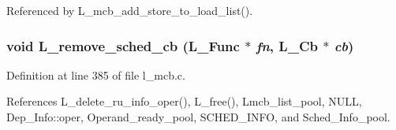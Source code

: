Referenced by L\_\-mcb\_\-add\_\-store\_\-to\_\-load\_\-list().
\subsubsection{\setlength{\rightskip}{0pt plus 5cm}void L\_\-remove\_\-sched\_\-cb (L\_\-Func $\ast$ {\em fn}, L\_\-Cb $\ast$ {\em cb})}\label{l__mcb_8h_ec6ec3dd6c6b7e836560d4ae0ef698b1}




Definition at line 385 of file l\_\-mcb.c.

References L\_\-delete\_\-ru\_\-info\_\-oper(), L\_\-free(), Lmcb\_\-list\_\-pool, NULL, Dep\_\-Info::oper, Operand\_\-ready\_\-pool, SCHED\_\-INFO, and Sched\_\-Info\_\-pool.